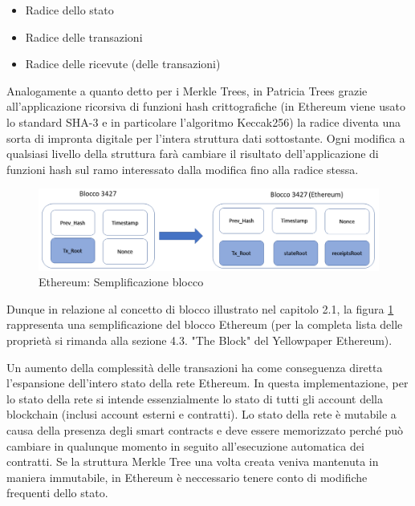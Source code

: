 \begin{itemize}
\item Radice dello stato
\item Radice delle transazioni
\item Radice delle ricevute (delle transazioni)
\end{itemize}

Analogamente a quanto detto per i Merkle Trees, in Patricia Trees grazie all'applicazione ricorsiva di funzioni hash crittografiche (in Ethereum viene usato lo standard SHA-3 e in particolare l'algoritmo Keccak256) la radice diventa una sorta di impronta digitale per l'intera struttura dati sottostante. Ogni modifica a qualsiasi livello della struttura farà cambiare il risultato dell'applicazione di funzioni hash sul ramo interessato dalla modifica fino alla radice stessa. 

\begin{figure}[H]
\centering
\includegraphics[width=1\textwidth]{immagini/EthBlockSimplified.png}
\caption{Ethereum: Semplificazione blocco}
\label{fig:BloccoEthereumSemplif}
\end{figure}

Dunque in relazione al concetto di blocco illustrato nel capitolo 2.1, la figura \ref{fig:BloccoEthereumSemplif} rappresenta una semplificazione del blocco Ethereum (per la completa lista delle proprietà si rimanda alla sezione 4.3. "The Block" del Yellowpaper Ethereum).

Un aumento della complessità delle transazioni ha come conseguenza diretta l’espansione dell’intero stato della rete Ethereum. In questa implementazione, per lo stato della rete si intende essenzialmente lo stato di tutti gli account della blockchain (inclusi account esterni e contratti). Lo stato della rete è mutabile a causa della presenza degli smart contracts e deve essere memorizzato perché può cambiare in qualunque momento in seguito all’esecuzione automatica dei contratti. Se la struttura Merkle Tree una volta creata veniva mantenuta in maniera immutabile, in Ethereum è neccessario tenere conto di modifiche frequenti dello stato. 

